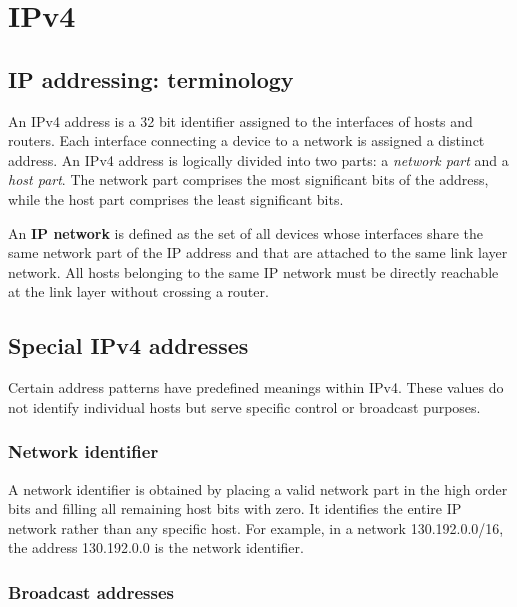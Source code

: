 \chapter{IPv4}

\section{IP addressing: terminology}

An IPv4 address is a 32 bit identifier assigned to the interfaces of hosts and routers. Each interface connecting a device to a network is assigned a distinct address. An IPv4 address is logically divided into two parts: a \emph{network part} and a \emph{host part}. The network part comprises the most significant bits of the address, while the host part comprises the least significant bits.

An \textbf{IP network} is defined as the set of all devices whose interfaces share the same network part of the IP address and that are attached to the same link layer network. All hosts belonging to the same IP network must be directly reachable at the link layer without crossing a router.

\section{Special IPv4 addresses}

Certain address patterns have predefined meanings within IPv4. These values do not identify individual hosts but serve specific control or broadcast purposes.

\subsection{Network identifier}

A network identifier is obtained by placing a valid network part in the high order bits and filling all remaining host bits with zero. It identifies the entire IP network rather than any specific host. For example, in a network 130.192.0.0/16, the address 130.192.0.0 is the network identifier.

\begin{center}
\end{center}

\subsection{Broadcast addresses}

